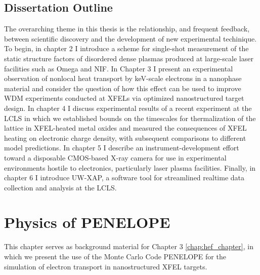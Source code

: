 \documentclass [11pt, proquest, article] {uwthesis}[2016/11/22]
\begin{document}
%





\section{Dissertation Outline}
The overarching theme in this thesis is the relationship, and frequent feedback, between scientific discovery and the development of new experimental techinique. To begin, in chapter 2 I introduce a scheme for single-shot measurement of the static structure factors of disordered dense plasmas produced at large-scale laser facilities such as Omega and NIF. In Chapter 3 I present an experimental observation of nonlocal heat transport by keV-scale electrons in a nanophase material and consider the question of how this effect can be used to improve WDM experiments conducted at XFELs via optimized nanostructured target design. In chapter 4 I discuss experimental results of a recent experiment at the LCLS in which we established bounds on the timescales for thermalization of the lattice in XFEL-heated metal oxides and measured the consequences of XFEL heating on electronic charge density, with subsequent comparisons to different model predictions.  In chapter 5 I describe an instrument-development effort toward a disposable CMOS-based X-ray camera for use in experimental environments hostile to electronics, particularly laser plasma facilities. Finally, in chapter 6 I introduce UW-XAP, a software tool for streamlined realtime data collection and analysis at the LCLS. 
 
\chapter{Physics of PENELOPE} %
This chapter serves as background material for Chapter 3 \ref{chap:hef_chapter}, in which we present the use of the Monte Carlo Code PENELOPE for the simulation of electron transport in nanostructured XFEL targets.
\end{document}
